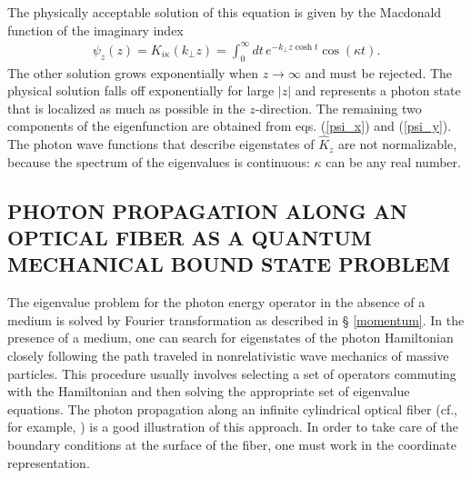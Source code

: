 \documentclass{article}
\begin{document}
The physically acceptable solution of this equation is given by the
Macdonald function of the imaginary index
\begin{eqnarray}
 \psi_z(z) = K_{i\kappa}(k_{\perp}z) = \int_0^{\infty}\!dt\,
 e^{-k_{\perp}z\cosh t}\cos(\kappa t).\label{macdon}
\end{eqnarray}
The other solution grows exponentially when $z\to\infty$ and must be
rejected. The physical solution falls off exponentially for large
$\vert{z}\vert$ and represents a photon state that is localized as much as
possible in the $z$-direction. The remaining two components of the
eigenfunction are obtained from eqs. (\ref{psi_x}) and (\ref{psi_y}). The
photon wave functions that describe eigenstates of ${\hat K}_z$ are not
normalizable, because the spectrum of the eigenvalues is continuous:
$\kappa$ can be any real number.

\subsection[PROPAGATION IN OPTICAL FIBER]{PHOTON PROPAGATION ALONG AN OPTICAL FIBER AS A QUANTUM MECHANICAL BOUND STATE PROBLEM}
The eigenvalue problem for the photon energy operator in the absence of a
medium is solved by Fourier transformation as described in \S
\ref{momentum}. In the presence of a medium, one can search for eigenstates
of the photon Hamiltonian closely following the path traveled in
nonrelativistic wave mechanics of massive particles. This procedure usually
involves selecting a set of operators commuting with the Hamiltonian and
then solving the appropriate set of eigenvalue equations. The photon
propagation along an infinite cylindrical optical fiber (cf., for example,
\cite{IBB_94}) is a good illustration of this approach. In order to take
care of the boundary conditions at the surface of the fiber, one must work
in the coordinate representation.
\end{document}
